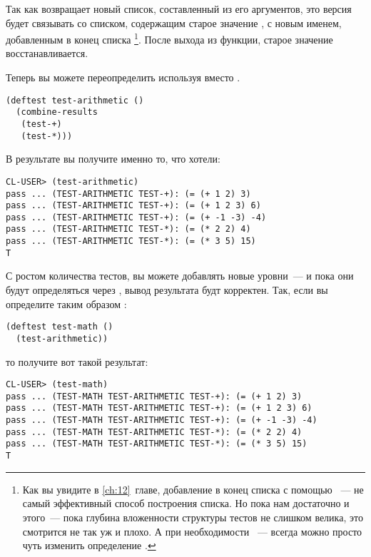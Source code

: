 Так как  возвращает новый список, составленный из его аргументов, это версия
будет связывать  со списком, содержащим старое значение
, с новым именем, добавленным в конец списка \footnote{Как вы увидите в
  \ref{ch:12}~главе, добавление в конец списка с помощью ~--- не самый эффективный
  способ построения списка. Но пока нам достаточно и этого~--- пока глубина вложенности
  структуры тестов не слишком велика, это смотрится не так уж и плохо. А при необходимости
 ~--- всегда можно просто чуть изменить определение .}. После выхода из
функции, старое значение  восстанавливается.

Теперь вы можете переопределить  используя  вместо
.

\begin{lstlisting}
(deftest test-arithmetic ()
  (combine-results
   (test-+)
   (test-*)))
\end{lstlisting}

В результате вы получите именно то, что хотели:

\begin{lstlisting}
CL-USER> (test-arithmetic)
pass ... (TEST-ARITHMETIC TEST-+): (= (+ 1 2) 3)
pass ... (TEST-ARITHMETIC TEST-+): (= (+ 1 2 3) 6)
pass ... (TEST-ARITHMETIC TEST-+): (= (+ -1 -3) -4)
pass ... (TEST-ARITHMETIC TEST-*): (= (* 2 2) 4)
pass ... (TEST-ARITHMETIC TEST-*): (= (* 3 5) 15)
T
\end{lstlisting}

С ростом количества тестов, вы можете добавлять новые уровни~--- и пока они будут
определяться через , вывод результата будт корректен. Так, если вы
определите таким образом :

\begin{lstlisting}
(deftest test-math ()
  (test-arithmetic))
\end{lstlisting}

то получите вот такой результат:

\begin{lstlisting}
CL-USER> (test-math)
pass ... (TEST-MATH TEST-ARITHMETIC TEST-+): (= (+ 1 2) 3)
pass ... (TEST-MATH TEST-ARITHMETIC TEST-+): (= (+ 1 2 3) 6)
pass ... (TEST-MATH TEST-ARITHMETIC TEST-+): (= (+ -1 -3) -4)
pass ... (TEST-MATH TEST-ARITHMETIC TEST-*): (= (* 2 2) 4)
pass ... (TEST-MATH TEST-ARITHMETIC TEST-*): (= (* 3 5) 15)
T
\end{lstlisting}

